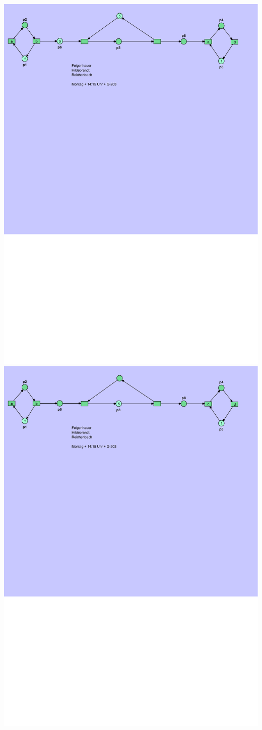 \documentclass[12pt,a4paper]{../krautsourcing/homework}
\begin{document}
\includegraphics[scale=0.8,trim={0mm 225mm 10mm 0cm},clip]{Aufgabe_6-4/Aufgabe_6-4-7-sim-4.pdf}
\includegraphics[scale=0.8,trim={0mm 225mm 10mm 0cm},clip]{Aufgabe_6-4/Aufgabe_6-4-7-sim-5.pdf}
\end{document}

